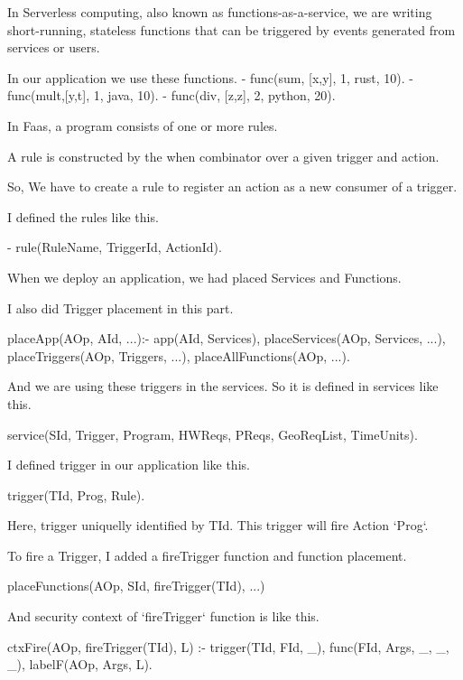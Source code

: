 \documentclass[../extensions.tex]{subfiles}
\begin{document}
In Serverless computing, also known as functions-as-a-service, we are writing short-running, stateless functions that can be triggered by events generated from services or users.

In our application we use these functions.
    - func(sum, [x,y], 1, rust, 10).
    - func(mult,[y,t], 1, java, 10).
    - func(div, [z,z], 2, python, 20).


In Faas, a program consists of one or more rules. 

A rule is constructed by the when combinator over a given trigger and action.

So, We have to create a rule to register an action as a new consumer of a trigger.

I defined the rules like this.
    
    - rule(RuleName, TriggerId, ActionId).



When we deploy an application, we had placed Services and Functions. 

I also did Trigger placement in this part. 

    placeApp(AOp, AId, ...):-
        app(AId, Services),
        placeServices(AOp, Services, ...),
        placeTriggers(AOp, Triggers, ...),
        placeAllFunctions(AOp, ...).

And we are using these triggers in the services. So it is defined in services like this.

    service(SId, Trigger, Program, HWReqs, PReqs, GeoReqList, TimeUnits).


I defined trigger in our application like this.

    trigger(TId, Prog, Rule).

Here, trigger uniquelly identified by TId. This trigger will fire Action `Prog`.


To fire a Trigger, I added a fireTrigger function and function placement.

    placeFunctions(AOp, SId, fireTrigger(TId), ...)

And security context of `fireTrigger` function is like this.

    ctxFire(AOp, fireTrigger(TId), L) :-
        trigger(TId, FId, _),
        func(FId, Args, _, _, _),
        labelF(AOp, Args, L). 
\end{document}
